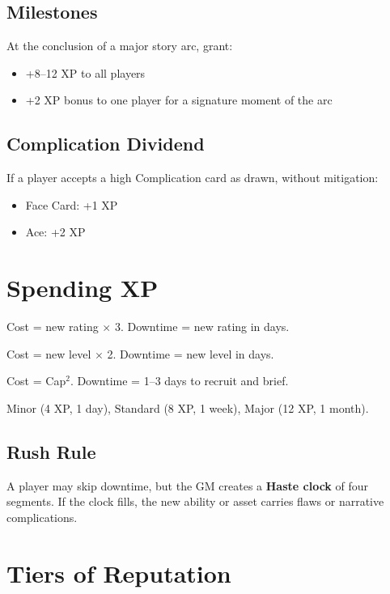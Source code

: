 \documentclass[12pt]{article}
\begin{document}
\subsection*{Milestones}
At the conclusion of a major story arc, grant:
\begin{itemize}
  \item +8--12 XP to all players  
  \item +2 XP bonus to one player for a signature moment of the arc  
\end{itemize}

\subsection*{Complication Dividend}
If a player accepts a high Complication card as drawn, without mitigation:
\begin{itemize}
  \item Face Card: +1 XP  
  \item Ace: +2 XP  
\end{itemize}

\section{Spending XP}

\begin{description}[leftmargin=2cm]
  \item[Attributes:] Cost = new rating $\times$ 3.  
  Downtime = new rating in days.  
  \item[Skills:] Cost = new level $\times$ 2.  
  Downtime = new level in days.  
  \item[On-Screen Followers:] Cost = Cap$^2$.  
  Downtime = 1--3 days to recruit and brief.  
  \item[Off-Screen Assets:] Minor (4 XP, 1 day), Standard (8 XP, 1 week), Major (12 XP, 1 month).  
\end{description}

\subsection*{Rush Rule}
A player may skip downtime, but the GM creates a \textbf{Haste clock} of four segments.  
If the clock fills, the new ability or asset carries flaws or narrative complications.

\section{Tiers of Reputation}
\end{document}
